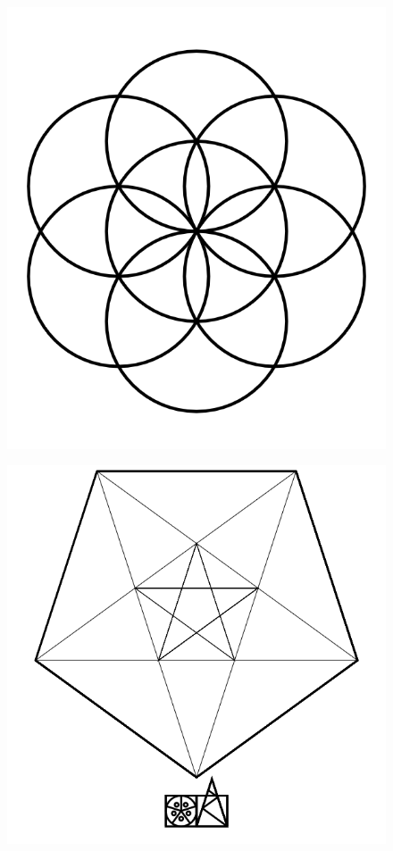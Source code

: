 \documentclass[17pt]{extreport}
\begin{document}
	
	\begin{figure}
		\centering
		\includegraphics[width=6.25in]{imageserver/uploadimages/circles6.png}
	\end{figure}

	
	\begin{figure}
		\centering
		\includegraphics[width=6.25in]{imageserver/uploadimages/image4.png}
	\end{figure}
	
\end{document}

